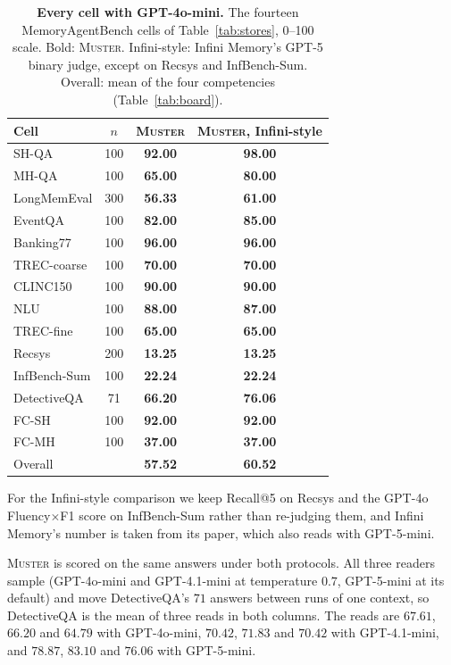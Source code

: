 \documentclass{article}
\newcommand{\tabfont}{\fontsize{7.5}{8.5}\selectfont\renewcommand{\arraystretch}{1.0}}
\newcommand{\sys}{\textsc{Muster}}
\begin{document}
\begin{table}[!htbp]
\centering\tabfont
\caption{\textbf{Every cell with GPT-4o-mini.} The fourteen MemoryAgentBench cells of Table~\ref{tab:stores}, 0--100 scale. Bold: \sys{}. Infini-style: Infini Memory's GPT-5 binary judge, except on Recsys and InfBench-Sum. Overall: mean of the four competencies (Table~\ref{tab:board}).}
\label{tab:expanded4o-mini}
\setlength{\tabcolsep}{4pt}\setlength{\aboverulesep}{0pt}\setlength{\belowrulesep}{0pt}\setlength{\extrarowheight}{0.8pt}
\begin{tabular}{lc>{\columncolor{oursbg}}c>{\columncolor{oursbg}}c}
\toprule
Cell & $n$ & \textbf{\sys{}} & \textbf{\sys{}, Infini-style} \\
\midrule
SH-QA & 100 & \textbf{92.00} & \textbf{98.00} \\
MH-QA & 100 & \textbf{65.00} & \textbf{80.00} \\
LongMemEval & 300 & \textbf{56.33} & \textbf{61.00} \\
EventQA & 100 & \textbf{82.00} & \textbf{85.00} \\
Banking77 & 100 & \textbf{96.00} & \textbf{96.00} \\
TREC-coarse & 100 & \textbf{70.00} & \textbf{70.00} \\
CLINC150 & 100 & \textbf{90.00} & \textbf{90.00} \\
NLU & 100 & \textbf{88.00} & \textbf{87.00} \\
TREC-fine & 100 & \textbf{65.00} & \textbf{65.00} \\
Recsys & 200 & \textbf{13.25} & \textbf{13.25} \\
InfBench-Sum & 100 & \textbf{22.24} & \textbf{22.24} \\
DetectiveQA & 71 & \textbf{66.20} & \textbf{76.06} \\
FC-SH & 100 & \textbf{92.00} & \textbf{92.00} \\
FC-MH & 100 & \textbf{37.00} & \textbf{37.00} \\
\midrule
Overall &  & \textbf{57.52} & \textbf{60.52} \\
\bottomrule
\end{tabular}
\end{table}

For the Infini-style comparison we keep Recall@5 on Recsys and the GPT-4o Fluency$\times$F1 score on InfBench-Sum rather than re-judging them, and Infini Memory's number is taken from its paper, which also reads with GPT-5-mini.

\sys{} is scored on the same answers under both protocols. All three readers sample (GPT-4o-mini and GPT-4.1-mini at temperature $0.7$, GPT-5-mini at its default) and move DetectiveQA's $71$ answers between runs of one context, so DetectiveQA is the mean of three reads in
both columns. The reads are $67.61$, $66.20$ and $64.79$ with GPT-4o-mini, $70.42$, $71.83$ and $70.42$ with GPT-4.1-mini, and
$78.87$, $83.10$ and $76.06$ with GPT-5-mini.
\end{document}
